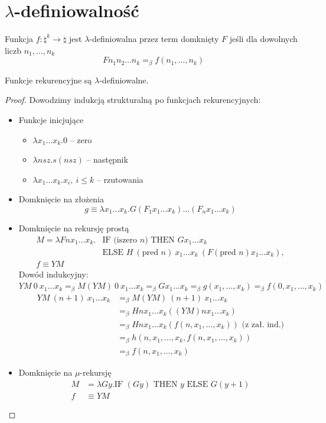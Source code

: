 \section{\(\lambda\)-definiowalność}
Funkcja \(f:\natural^k \to \natural\) jest \(\lambda\)-definiowalna przez term domknięty \(F\) jeśli dla dowolnych liczb \(n_1, \dots, n_k\)
\[ Fn_1n_2 \dots n_k =_\beta f(n_1,\dots,n_k) \]

\begin{theorem}[Church]
    Funkcje rekurencyjne są \(\lambda\)-definiowalne.
\end{theorem}
\begin{proof}
    Dowodzimy indukcją strukturalną po funkcjach rekurencyjnych:
    \begin{itemize}
        \item Funkcje inicjujące
        \begin{itemize}
        \singlespacing
            \item \(\lambda x_1\dots x_k.0\) -- zero
            \item \(\lambda nsz.s(nsz)\) -- następnik
            \item \(\lambda x_1 \dots x_k.x_i, \ i \leq k\) -- rzutowania
        \end{itemize}

        \item Domknięcie na złożenia
        \[ g \equiv \lambda x_1 \dots x_k.G(F_1x_1 \dots x_k) \dots(F_nx_1 \dots x_k) \]
    
        \item Domknięcie na rekursję prostą
        \begin{align*}
            M = \lambda F n x_1 \dots x_k.&\text{IF (iszero } n \text{) THEN } G x_1 \dots x_k \\
            &\text{ELSE } H \: (\text{pred } n) \: x_1\dots x_k \: (F (\text{pred } n) x_1 \dots x_k), \\
            f \equiv YM
        \end{align*}
        Dowód indukcyjny: \\
        \( YM \: 0 \: x_1 \dots x_k =_\beta M(YM) \: 0 \: x_1 \dots x_k =_\beta G x_1 \dots x_k =_\beta g(x_1, \dots, x_k) =_\beta f(0, x_1,\dots, x_k) \)
        \begin{align*}
            YM \: (n+1) \: x_1 \dots x_k &=_\beta M(YM) \: (n+1) \: x_1 \dots x_k \\
            &=_\beta H n x_1 \dots x_k ((YM) n x_1 \dots x_k) \\
            &=_\beta Hn x_1 \dots x_k (f(n, x_1, \dots, x_k)) \text{ (z zał. ind.)} \\
            &=_\beta h(n, x_1, \dots, x_k, f(n, x_1, \dots, x_k)) \\
            &=_\beta f(n, x_1, \dots, x_k)
        \end{align*}

        \item Domknięcie na \(\mu\)-rekursję
        \[
        \begin{aligned}
            M & = \lambda G y.\text{IF }(G y) \text{ THEN } y \text{ ELSE } G (y+1) \\[0.5em]
            f & \equiv YM
        \end{aligned}
    \]
    \end{itemize}
\end{proof}